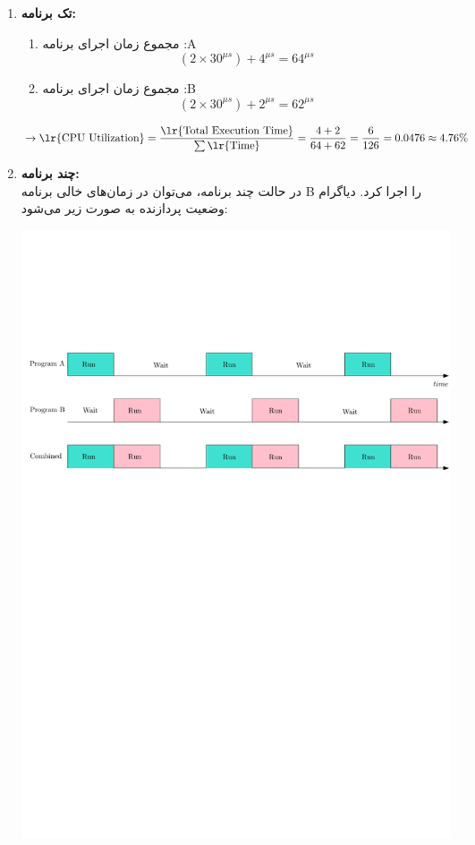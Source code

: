\begin{qsolve}
	\begin{enumerate}
		\item 
		\textbf{تک برنامه:}\\
		
		\begin{enumerate}
			\item 
			 مجموع زمان اجرای برنامه :A\\
			 $$ (2\times 30^{\mu s}) + 4^{\mu s}=64^{\mu s} $$
			 
			 
			 
			 \item
			 مجموع زمان اجرای برنامه :B\\
			 $$ (2\times 30^{\mu s}) + 2^{\mu s}=62^{\mu s} $$
		\end{enumerate}
		
		$$ \rightarrow \text{\lr{CPU Utilization}} = \frac{\text{\lr{Total Execution Time}}}{\sum \text{\lr{Time}}}=\frac{4 + 2}{64 + 62}=\frac{6}{126}=0.0476\approx 4.76 \% $$
		
		
		\item 
		\textbf{چند برنامه:}\\
		در حالت چند برنامه، می‌توان در زمان‌های خالی  برنامه B را اجرا کرد. دیاگرام وضعیت پردازنده به صورت زیر می‌شود:
		
		
		\begin{center}
			\includegraphics*[width=1\linewidth]{pics/Q6.pdf}
		\end{center}
		

\end{enumerate}
\end{qsolve}
